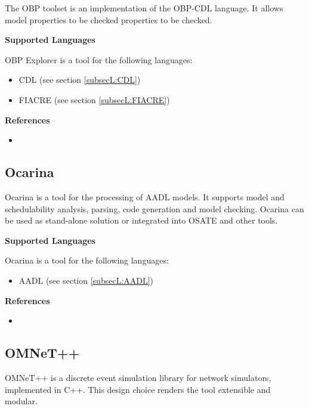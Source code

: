 The OBP toolset is an implementation of the OBP-CDL language. It allows model properties to be checked properties to be checked.

\textbf{Supported Languages}

OBP Explorer is a tool for the following languages:
\begin{itemize}
	\item CDL (see section \ref{subsecL:CDL})
	\item FIACRE (see section \ref{subsecL:FIACRE})
\end{itemize}


\textbf{References}
\begin{itemize}
	
\item {}
\end{itemize}



\subsection{Ocarina}
\label{subsecT:Ocarina}


Ocarina is a tool for the processing of AADL models.  It supports model and schedulability analysis, parsing, code generation and model checking. Ocarina can be used as stand-alone solution or integrated into OSATE and other tools.

\textbf{Supported Languages}

Ocarina is a tool for the following languages:
\begin{itemize}
	\item AADL (see section \ref{subsecL:AADL})
\end{itemize}


\textbf{References}
\begin{itemize}
	
\item {}
\end{itemize}



\subsection{OMNeT++}
\label{subsecT:OMNetPPTool}


OMNeT++ is a discrete event simulation library for network simulators, implemented in C++. This design choice renders the tool extensible and modular.

